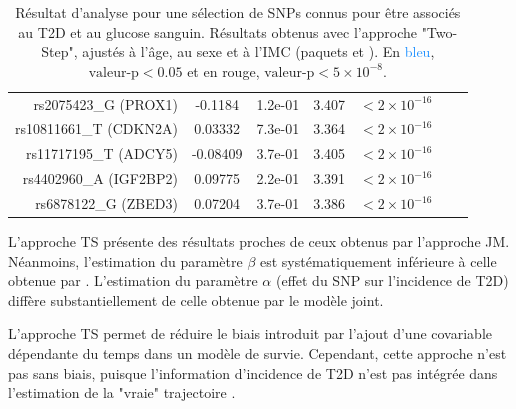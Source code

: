 \documentclass[11pt, a4paper]{article}
\begin{document}
{\begin{table}[ht]
\begin{center}
\begin{tabular}{rcccccc}
            rs2075423\_G (PROX1) & -0.1184 & 1.2e-01 & \textcolor{firebrick2}{3.407} & \textcolor{firebrick2}{$<2\times 10^{-16}$} \\
            rs10811661\_T (CDKN2A) & 0.03332 & 7.3e-01 & \textcolor{firebrick2}{3.364} & \textcolor{firebrick2}{$<2\times 10^{-16}$} \\
            rs11717195\_T (ADCY5) & -0.08409 & 3.7e-01 & \textcolor{firebrick2}{3.405} & \textcolor{firebrick2}{$<2\times 10^{-16}$} \\
            rs4402960\_A (IGF2BP2) & 0.09775 & 2.2e-01 & \textcolor{firebrick2}{3.391} & \textcolor{firebrick2}{$<2\times 10^{-16}$} \\
            rs6878122\_G (ZBED3) & 0.07204 & 3.7e-01 & \textcolor{firebrick2}{3.386} & \textcolor{firebrick2}{$<2\times 10^{-16}$} \\
            \hline
        \end{tabular}
    \end{center}
    \vspace{-15pt}
    \caption{Résultat d'analyse pour une sélection de SNPs connus pour être associés au T2D et au glucose sanguin.
    Résultats obtenus avec l'approche "Two-Step", ajustés à l'âge, au sexe et à l'IMC (paquets  et ).\newline
    {\small En \textcolor{dodgerblue}{bleu}, $\textrm{valeur-p}<0.05$ et en \textcolor{firebrick2}{rouge}, $\textrm{valeur-p}<5\times 10^{-8}$}.}
    \label{tab:desisrTS}
\end{table}\setlength{\tabcolsep}{10pt}
L'approche TS présente des résultats proches de ceux obtenus par l'approche JM.
Néanmoins, l'estimation du paramètre $\beta$ est systématiquement inférieure à celle obtenue par .
L'estimation du paramètre $\alpha$ (effet du SNP sur l'incidence de T2D) diffère substantiellement de celle obtenue par le modèle joint.}
\par{L'approche TS permet de réduire le biais introduit par l'ajout d'une covariable dépendante du temps dans un
modèle de survie. Cependant, cette approche n'est pas sans biais, puisque l'information d'incidence de T2D
n'est pas intégrée dans l'estimation de la "vraie" trajectoire \citep{mccrink_advances_2013}.}

\clearpage
\end{document}
